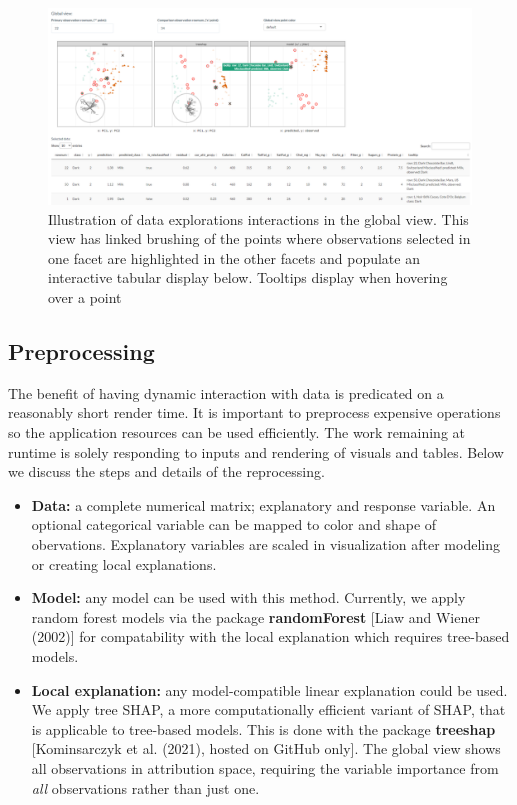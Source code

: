 \documentclass[
  article]{article}
\begin{document}
\begin{figure}

{\centering \includegraphics[width=1\linewidth]{./figures/app_interactions} 

}

\caption{Illustration of data explorations interactions in the global view. This view has linked brushing of the points where observations selected in one facet are highlighted in the other facets and populate an interactive tabular display below. Tooltips display when hovering over a point}\label{fig:interactions}
\end{figure}

\hypertarget{preprocessing}{%
\subsection{Preprocessing}\label{preprocessing}}

The benefit of having dynamic interaction with data is predicated on a reasonably short render time. It is important to preprocess expensive operations so the application resources can be used efficiently. The work remaining at runtime is solely responding to inputs and rendering of visuals and tables. Below we discuss the steps and details of the reprocessing.




\begin{itemize}
    \item \textbf{Data:} a complete numerical matrix; explanatory and response variable. An optional categorical variable can be mapped to color and shape of obervations. Explanatory variables are scaled in visualization after modeling or creating local explanations. 
    \item \textbf{Model:} any model can be used with this method. Currently, we apply random forest models via the package \textbf{randomForest} [Liaw and Wiener (2002)] for compatability with the local explanation which requires tree-based models.
    \item \textbf{Local explanation:} any model-compatible linear explanation could be used. We apply tree SHAP, a more computationally efficient variant of SHAP, that is applicable to tree-based models. This is done with the package \textbf{treeshap} [Kominsarczyk et al. (2021), hosted on GitHub only]. The global view shows all observations in attribution space, requiring the variable importance from \emph{all} observations rather than just one.
\end{itemize}
\end{document}

